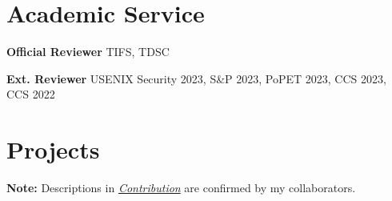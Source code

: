\documentclass{resume}
\begin{document}
\section{Academic Service}
\begin{content}
  {\bf Official Reviewer} \enspace TIFS, TDSC

		{\bf Ext. Reviewer} \enspace USENIX Security 2023, S\&P 2023, PoPET 2023, CCS 2023, CCS 2022
\end{content}

\section{Projects}

\textbf{Note:} Descriptions in \underline{\textit{Contribution}} are confirmed by my collaborators.
\end{document}
